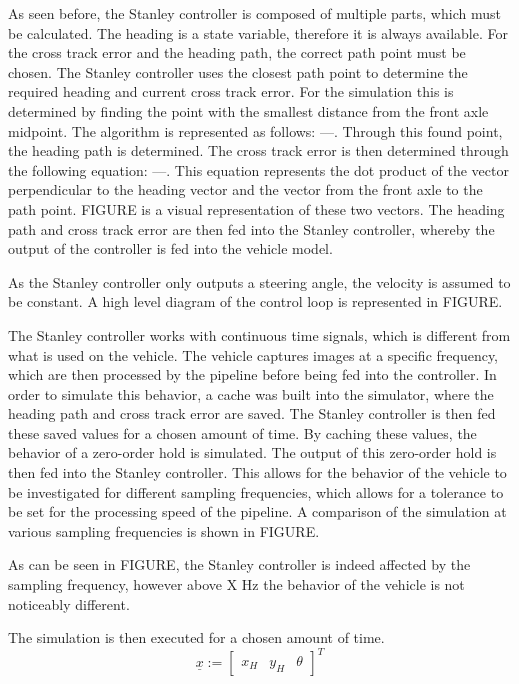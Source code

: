 \documentclass[arbeit=studie,oneside,BCOR=12mm]{ArbeitRST}
\begin{document}
As seen before, the Stanley controller is composed of multiple parts, which
must be calculated. The heading is a state variable, therefore it is always
available. For the cross track error and the heading path, the correct path
point must be chosen. The Stanley controller uses the closest path point to
determine the required heading and current cross track error. For the
simulation this is determined by finding the point with the smallest distance
from the front axle midpoint. The algorithm is represented as follows: ---.
Through this found point, the heading path is determined. The cross track error
is then determined through the following equation: ---. This equation
represents the dot product of the vector perpendicular to the heading vector
and the vector from the front axle to the path point. FIGURE is a visual
representation of these two vectors. The heading path and cross track error are
then fed into the Stanley controller, whereby the output of the controller is
fed into the vehicle model.

As the Stanley controller only outputs a steering angle, the velocity is
assumed to be constant. A high level diagram of the control loop is represented
in FIGURE.

The Stanley controller works with continuous time signals, which is different
from what is used on the vehicle. The vehicle captures images at a specific
frequency, which are then processed by the pipeline before being fed into the
controller. In order to simulate this behavior, a cache was built into the
simulator, where the heading path and cross track error are saved. The Stanley
controller is then fed these saved values for a chosen amount of time. By
caching these values, the behavior of a zero-order hold is simulated. The
output of this zero-order hold is then fed into the Stanley controller. This
allows for the behavior of the vehicle to be investigated for different
sampling frequencies, which allows for a tolerance to be set for the processing
speed of the pipeline. A comparison of the simulation at various sampling
frequencies is shown in FIGURE.

As can be seen in FIGURE, the Stanley controller is indeed affected by the
sampling frequency, however above X Hz the behavior of the vehicle is not
noticeably different. 

The simulation is then executed for a chosen amount of time. 
    \begin{equation} 
        \underline{x} := 
        \begin{bmatrix}
            x_H & y_H & \theta
        \end{bmatrix}^T 
        \label{Zustandsvektor}
    \end{equation}
\end{document}
